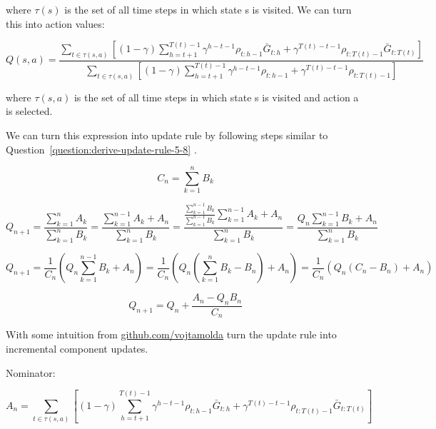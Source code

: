 \documentclass[11pt]{article}
\begin{document}
    where $\tau(s)$ is the set of all time steps in which state s is visited.
    We can turn this into action values:

    \begin{equation}
        Q(s,a) =  \frac{ \sum_{t \in \tau(s, a) } [ (1-\gamma) \sum_{h=t+1}^{T(t)-1} \gamma^{h-t-1} \rho_{t:h-1} \bar{G}_{t:h} + \gamma^{T(t)-t-1} \rho_{t:T(t)-1} \bar{G}_{t:T(t)} ]   }{ \sum_{t \in \tau(s,a) } [ (1-\gamma) \sum_{h=t+1}^{T(t)-1} \gamma^{h-t-1} \rho_{t:h-1} + \gamma^{T(t)-t-1} \rho_{t:T(t)-1} ]  }
    \end{equation}

    where $\tau(s,a)$ is the set of all time steps in which state s is visited and action a is selected.

    We can turn this expression into update rule by following steps similar to Question~\ref{question:derive-update-rule-5-8} .

    \begin{equation}
        C_{n} = \sum_{k=1}^{n} B_{k}
    \end{equation}

    \begin{equation}
        Q_{n+1} = \frac{ \sum_{k=1}^{n} A_{k}}{ \sum_{k=1}^{n} B_{k} } = \frac{ \sum_{k=1}^{n-1} A_{k} + A_{n}}{ \sum_{k=1}^{n} B_{k} } = \frac{ \frac{\sum_{k=1}^{n-1} B_{k} }{\sum_{k=1}^{n-1} B_{k} } \sum_{k=1}^{n-1} A_{k} + A_{n}}{ \sum_{k=1}^{n} B_{k} }  = \frac{ Q_{n} \sum_{k=1}^{n-1} B_{k} + A_{n}}{ \sum_{k=1}^{n} B_{k} }
    \end{equation}

    \begin{equation}
        Q_{n+1}  = \frac{1}{C_{n}} (  Q_{n} \sum_{k=1}^{n-1} B_{k} + A_{n} ) = \frac{1}{C_{n}} ( Q_{n} ( \sum_{k=1}^{n} B_{k} - B_{n} ) + A_{n} ) = \frac{1}{C_{n}} ( Q_{n} ( C_{n} - B_{n} ) + A_{n} )
    \end{equation}

     \begin{equation}
        Q_{n+1} = Q_{n} + \frac{A_{n} -  Q_{n} B_{n} }{C_{n}}
    \end{equation}

    With some intuition from \href{https://github.com/vojtamolda/reinforcement-learning-an-introduction/blob/main/chapter05/chapter05.pdf}{github.com/vojtamolda} turn the update rule into incremental component updates.

    Nominator:

    \begin{equation}
        A_n = \sum_{t \in \tau(s, a) } [ (1-\gamma) \sum_{h=t+1}^{T(t)-1} \gamma^{h-t-1} \rho_{t:h-1} \bar{G}_{t:h} + \gamma^{T(t)-t-1} \rho_{t:T(t)-1} \bar{G}_{t:T(t)} ]
    \end{equation}
\end{document}
